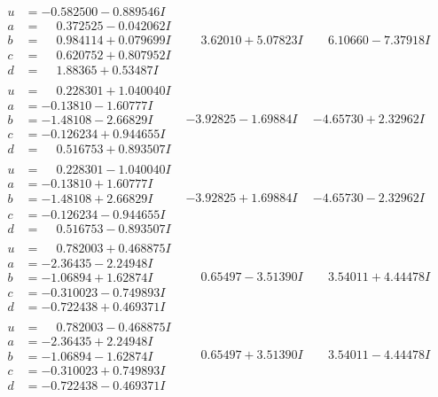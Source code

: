 \documentclass[1p]{elsarticle_modified}
\theoremstyle{definition}
\begin{document}
$$\begin{array}{c|c|c}
\begin{aligned}
u &= -0.582500 - 0.889546 I \\
a &= \phantom{-}0.372525 - 0.042062 I \\
b &= \phantom{-}0.984114 + 0.079699 I \\
c &= \phantom{-}0.620752 + 0.807952 I \\
d &= \phantom{-}1.88365 + 0.53487 I\end{aligned}
 & \phantom{-}3.62010 + 5.07823 I & \phantom{-}6.10660 - 7.37918 I \\ \hline\begin{aligned}
u &= \phantom{-}0.228301 + 1.040040 I \\
a &= -0.13810 - 1.60777 I \\
b &= -1.48108 - 2.66829 I \\
c &= -0.126234 + 0.944655 I \\
d &= \phantom{-}0.516753 + 0.893507 I\end{aligned}
 & -3.92825 - 1.69884 I & -4.65730 + 2.32962 I \\ \hline\begin{aligned}
u &= \phantom{-}0.228301 - 1.040040 I \\
a &= -0.13810 + 1.60777 I \\
b &= -1.48108 + 2.66829 I \\
c &= -0.126234 - 0.944655 I \\
d &= \phantom{-}0.516753 - 0.893507 I\end{aligned}
 & -3.92825 + 1.69884 I & -4.65730 - 2.32962 I \\ \hline\begin{aligned}
u &= \phantom{-}0.782003 + 0.468875 I \\
a &= -2.36435 - 2.24948 I \\
b &= -1.06894 + 1.62874 I \\
c &= -0.310023 - 0.749893 I \\
d &= -0.722438 + 0.469371 I\end{aligned}
 & \phantom{-}0.65497 - 3.51390 I & \phantom{-}3.54011 + 4.44478 I \\ \hline\begin{aligned}
u &= \phantom{-}0.782003 - 0.468875 I \\
a &= -2.36435 + 2.24948 I \\
b &= -1.06894 - 1.62874 I \\
c &= -0.310023 + 0.749893 I \\
d &= -0.722438 - 0.469371 I\end{aligned}
 & \phantom{-}0.65497 + 3.51390 I & \phantom{-}3.54011 - 4.44478 I\\

\end{array}$$
\end{document}
